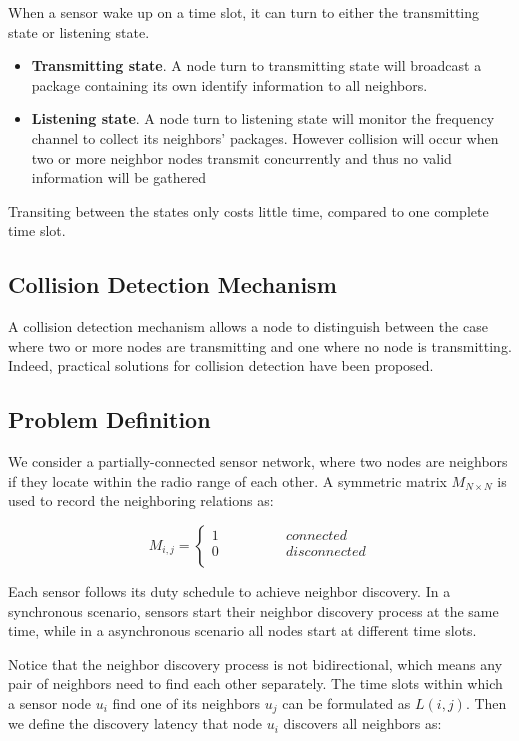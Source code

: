 When a sensor wake up on a time slot, it can turn to either the transmitting state or listening state. 
\begin{itemize}
\item \textbf{Transmitting state}. A node turn to transmitting state will broadcast a package containing its own identify 
information to all neighbors.
\item  \textbf{Listening state}. A node turn to listening state will monitor the frequency channel to collect its neighbors' packages.
However collision will occur when two or more neighbor nodes transmit concurrently and thus no valid information will be gathered
\end{itemize}
Transiting between the states only costs little time, compared to one complete time slot.

\subsection{Collision Detection Mechanism}

A collision detection mechanism allows a node to distinguish between 
the case where two or more nodes are transmitting and one where no 
node is transmitting. Indeed, practical solutions for collision detection 
have been proposed. 





\subsection{Problem Definition}

We consider a partially-connected sensor network, 
where two nodes are neighbors if they locate within the radio range of each other. 
A  symmetric matrix $M_{N\times N}$ is used to record the neighboring relations as:

$$ M_{i,j}=\left\{
\begin{aligned}
1  & & & & & & {connected}\\
0  & & & & & & {disconnected}\\
\end{aligned}
\right.
$$

Each sensor follows its duty schedule to achieve neighbor discovery. In a synchronous scenario,
sensors start their neighbor discovery process at the same time, while in a asynchronous  scenario
all nodes start at different time slots.
 
Notice that the neighbor discovery process is not bidirectional, which means any pair of neighbors 
need to find each other separately. The time slots within which a sensor node $u_i$ find one of its neighbors $u_j$ can be formulated 
as $L(i,j)$. Then we define the discovery latency that node $u_i$ discovers all neighbors as:

